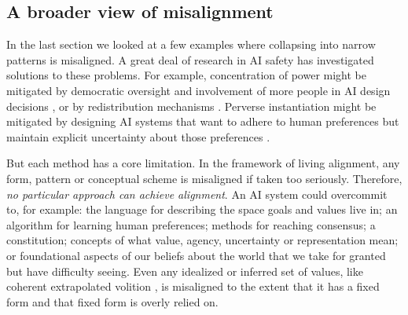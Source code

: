 \documentclass[12pt]{article}
\begin{document}

\subsection{A broader view of misalignment}

In the last section we looked at a few examples where collapsing into narrow patterns is misaligned. A great deal of research in AI safety has investigated solutions to these problems. For example, concentration of power might be mitigated by democratic oversight and involvement of more people in AI design decisions \citep{birhane2022power, sloane2022participation, selbst2019fairness, lazar2023ai, dafoe2018ai, openai2023democratic}, or by redistribution mechanisms \citep{okeefe2020windfall, sharp2025agentic, gough2019universal, susskind2020world}. Perverse instantiation might be mitigated by designing AI systems that want to adhere to human preferences but maintain explicit uncertainty about those preferences \citep{russell2019human, hadfieldmenell2017off, hadfieldmenell2016cooperative, shah2020benefits, jeon2020reward}. 

But each method has a core limitation. In the framework of living alignment, any form, pattern or conceptual scheme is misaligned if taken too seriously. Therefore, \textit{no particular approach can achieve alignment}. An AI system could overcommit to, for example: the language for describing the space goals and values live in; an algorithm for learning human preferences; methods for reaching consensus; a constitution; concepts of what value, agency, uncertainty or representation mean; or foundational aspects of our beliefs about the world that we take for granted but have difficulty seeing. Even any idealized or inferred set of values, like coherent extrapolated volition \citep{yudkowsky2004coherent}, is misaligned to the extent that it has a fixed form and that fixed form is overly relied on.



\end{document}
